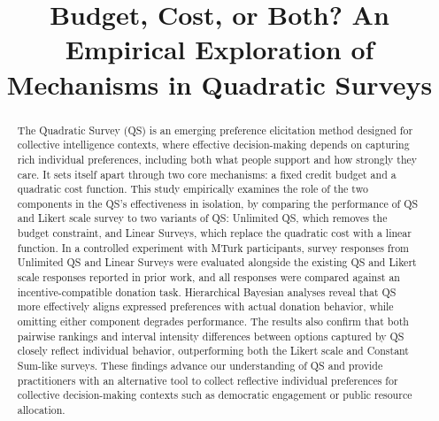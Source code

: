 \documentclass[sigconf]{acmart}
\begin{document}

\title[Empirical Exploration of Quadratic Survey Mechanisms]{Budget, Cost, or Both? An Empirical Exploration of Mechanisms in Quadratic Surveys}








\renewcommand{\shortauthors}{Ti-Chung Cheng et al.}

\begin{abstract}
    The Quadratic Survey (QS) is an emerging preference elicitation method designed for collective intelligence contexts, where effective decision-making depends on capturing rich individual preferences, including both what people support and how strongly they care. It sets itself apart through two core mechanisms: a fixed credit budget and a quadratic cost function. This study empirically examines the role of the two components in the QS's effectiveness in isolation, by comparing the performance of QS and Likert scale survey to two variants of QS: Unlimited QS, which removes the budget constraint, and Linear Surveys, which replace the quadratic cost with a linear function. In a controlled experiment with MTurk participants, survey responses from Unlimited QS and Linear Surveys were evaluated alongside the existing QS and Likert scale responses reported in prior work, and all responses were compared against an incentive-compatible donation task. Hierarchical Bayesian analyses reveal that QS more effectively aligns expressed preferences with actual donation behavior, while omitting either component degrades performance. The results also confirm that both pairwise rankings and interval intensity differences between options captured by QS closely reflect individual behavior, outperforming both the Likert scale and Constant Sum-like surveys. These findings advance our understanding of QS and provide practitioners with an alternative tool to collect reflective individual preferences for collective decision-making contexts such as democratic engagement or public resource allocation.
\end{abstract}
\end{document}
